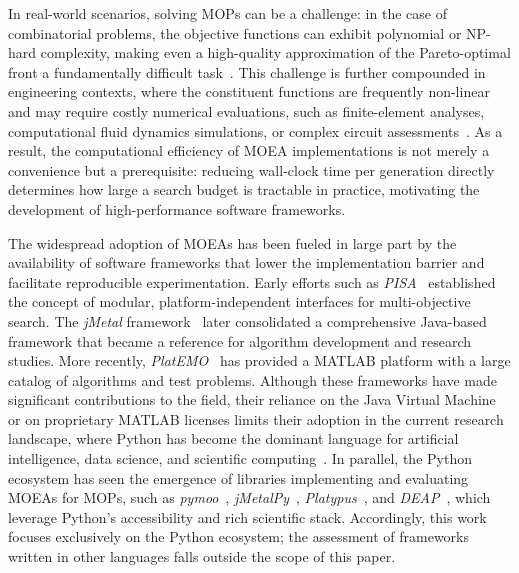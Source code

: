 \documentclass[final,5p,times,twocolumn]{elsarticle}
\begin{document}
In real-world scenarios, solving MOPs can be a challenge: in the case of combinatorial problems, the objective functions can exhibit polynomial or NP-hard complexity, making even a high-quality approximation of the Pareto-optimal front a fundamentally difficult task~\cite{CLV07,deb01}. This challenge is further compounded in engineering contexts, where the constituent functions are frequently non-linear and may require costly numerical evaluations, such as finite-element analyses, computational fluid dynamics simulations, or complex circuit assessments~\cite{ZGM23}. As a result, the computational efficiency of MOEA implementations is not merely a convenience but a prerequisite: reducing wall-clock time per generation directly determines how large a search budget is tractable in practice, motivating the development of high-performance software frameworks.

The widespread adoption of MOEAs has been fueled in large part by the availability of software frameworks that lower the implementation barrier and facilitate reproducible experimentation. Early efforts such as \textit{PISA}~\cite{BLT+03} established the concept of modular, platform-independent interfaces for multi-objective search. The \textit{jMetal} framework~\cite{DN11} later consolidated a comprehensive Java-based framework that became a reference for algorithm development and research studies. More recently, \textit{PlatEMO}~\cite{TCZ+17} has provided a MATLAB platform with a large catalog of algorithms and test problems. Although these frameworks have made significant contributions to the field, their reliance on the Java Virtual Machine or on proprietary MATLAB licenses limits their adoption in the current research landscape, where Python has become the dominant language for artificial intelligence, data science, and scientific computing~\cite{HMV+20}. In parallel, the Python ecosystem has seen the emergence of libraries implementing and evaluating MOEAs for MOPs, such as \textit{pymoo}~\cite{BD20}, \textit{jMetalPy}~\cite{BNG+19}, \textit{Platypus}~\cite{hadka15}, and \textit{DEAP}~\cite{FDG+12}, which leverage Python's accessibility and rich scientific stack. Accordingly, this work focuses exclusively on the Python ecosystem; the assessment of frameworks written in other languages falls outside the scope of this paper.
\end{document}
